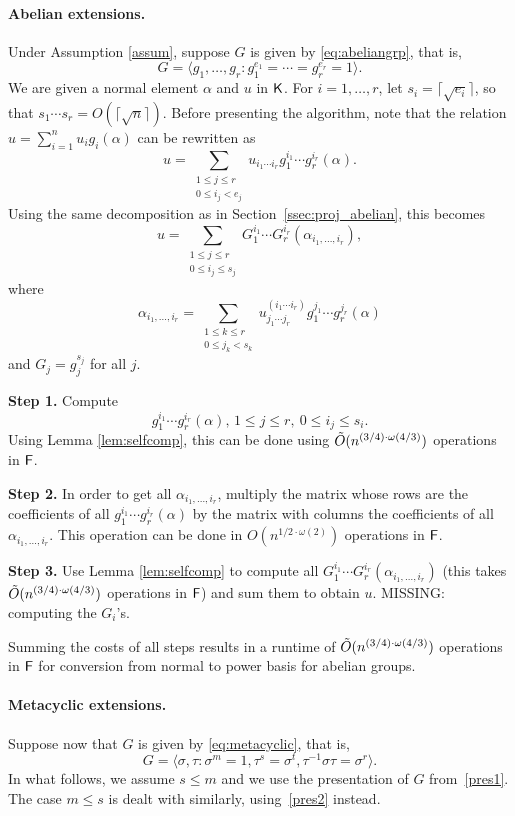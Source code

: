 \paragraph{Abelian extensions.} Under Assumption \ref{assum}, suppose
$G$ is given by \eqref{eq:abeliangrp}, that is,
\[ 
 G= \langle g_1, \ldots , g_r: g_{1}^{e_1} = \cdots = g_{r}^{e_r} = 1
  \rangle.
\]
We are given a normal element $\alpha$ and $u$ in ${\mathsf{K}}$.  For
$i=1,\dots,r$, let $s_i = \lceil \sqrt{e_i} \rceil$, so that $s_1
\cdots s_r = O(\lceil \sqrt{n} \rceil)$. Before presenting the
algorithm, note that
the relation $u=\sum_{i=1}^n u_i g_i(\alpha)$ can be rewritten as
$$u=\sum_{\substack{1 \leq j \leq r\\ 0 \leq i_j < e_j}} u_{i_1 \cdots
  i_r} g_1^{i_1} \cdots g_r^{i_r}(\alpha).$$
Using the same decomposition as in Section~\ref{ssec:proj_abelian},
this becomes
$$u
 = \sum_{\substack{1 \leq j
    \leq r\\ 0 \leq i_j \leq s_j}} G_1^{i_1} \cdots
G_r^{i_r} (\alpha_{i_1,\dots,i_r}),$$ where $$\alpha_{i_1, \dots,
  i_r} = \sum_{\substack{1 \leq k \leq r\\ 0 \leq j_k < s_k}} u^{(i_1
  \cdots i_r)}_{j_1 \cdots j_r} g_1^{j_1} \cdots g_r^{j_r}(\alpha)$$
and $G_j = g_j^{s_j}$ for all $j$.

\smallskip\noindent\textbf{Step 1.} Compute $$g_1^{i_1} \cdots
g_r^{i_r}(\alpha), \, 1 \leq j \leq r,\ 0 \leq i_j \leq s_i.$$ Using
Lemma \ref{lem:selfcomp}, this can be done using $\tilde{O}(n^{(3/4)\cdot \omega(4/3)})$
operations in ${\mathsf{F}}$.

\smallskip\noindent\textbf{Step 2.} In order to get all $\alpha_{i_1,
  \dots, i_r}$, multiply the matrix whose rows are the coefficients of
all $g_1^{i_1} \cdots g_r^{i_r}(\alpha)$ by the matrix with columns
the coefficients of all $\alpha_{i_1, \dots, i_r}$. This operation can
be done in $O(n^{1/2 \cdot \omega(2)})$ operations in ${\mathsf{F}}$.

\smallskip\noindent\textbf{Step 3.} Use Lemma \ref{lem:selfcomp} to
compute all $ G_1^{i_1} \cdots G_r^{i_r} (\alpha_{i_1,\dots,i_r})$
(this takes $\tilde{O}(n^{(3/4)\cdot \omega(4/3)})$ operations in ${\mathsf{F}}$) and sum them to
obtain $u$. MISSING: computing the $G_i$'s.

\smallskip

Summing the costs of all steps results in a runtime of
$\tilde{O}(n^{(3/4)\cdot \omega(4/3)})$ operations in ${\mathsf{F}}$ for conversion from
normal to power basis for abelian groups.

\paragraph{Metacyclic extensions.} Suppose now that $G$ is given by
\eqref{eq:metacyclic}, that is,
\begin{equation*}
G=  \langle \sigma,\tau: \sigma^m = 1,  \tau^s = \sigma^t, \tau^{-1}\sigma \tau = \sigma^r \rangle.
\end{equation*}
In what follows, we assume $s \leq m$ and we use the presentation
of $G$ from~\eqref{pres1}. The case $m \le s$ is dealt with similarly,
using~\eqref{pres2} instead.

